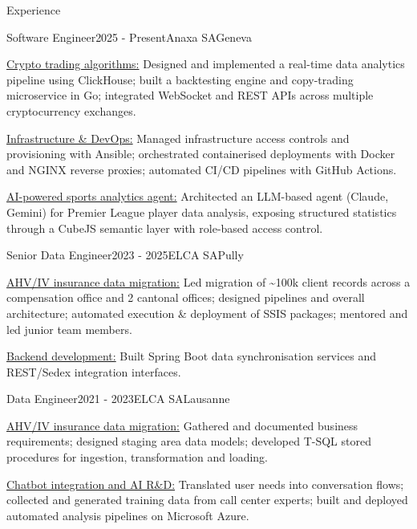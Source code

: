 \documentclass[
	a4paper, %
	10pt, %
]{resume} %
\newcommand{\lead}[1]{{\underline{#1}}}
\begin{document}
\begin{rSection}{Experience}

	\begin{rSubsection}{Software Engineer}{2025 - Present}{Anaxa SA}{Geneva}
		\item \lead{Crypto trading algorithms:} Designed and implemented a real-time data analytics pipeline using ClickHouse; built a backtesting engine and copy-trading microservice in Go; integrated WebSocket and REST APIs across multiple cryptocurrency exchanges.
		\item \lead{Infrastructure \& DevOps:} Managed infrastructure access controls and provisioning with Ansible; orchestrated containerised deployments with Docker and NGINX reverse proxies; automated CI/CD pipelines with GitHub Actions.
		\item \lead{AI-powered sports analytics agent:} Architected an LLM-based agent (Claude, Gemini) for Premier League player data analysis, exposing structured statistics through a CubeJS semantic layer with role-based access control.
	\end{rSubsection}

	\begin{rSubsection}{Senior Data Engineer}{2023 - 2025}{ELCA SA}{Pully}
		\item \lead{AHV/IV insurance data migration:} Led migration of \textasciitilde100k client records across a compensation office and 2 cantonal offices; designed pipelines and overall architecture; automated execution \& deployment of SSIS packages; mentored and led junior team members.
		\item \lead{Backend development:} Built Spring Boot data synchronisation services and REST/Sedex integration interfaces.
	\end{rSubsection}


	\begin{rSubsection}{Data Engineer}{2021 - 2023}{ELCA SA}{Lausanne}
		\item \lead{AHV/IV insurance data migration:} Gathered and documented business requirements; designed staging area data models; developed T-SQL stored procedures for ingestion, transformation and loading.
		\item \lead{Chatbot integration and AI R\&D:} Translated user needs into conversation flows; collected and generated training data from call center experts; built and deployed automated analysis pipelines on Microsoft Azure.
	\end{rSubsection}


\end{rSection}
\end{document}
